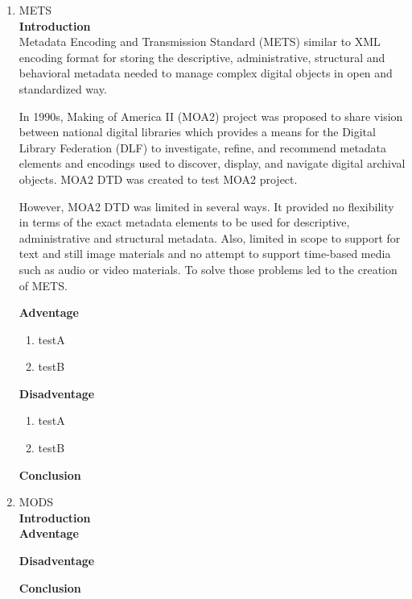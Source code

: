 \documentclass[a4paper]{article} %
\begin{document}
	\begin{enumerate}
		\item METS\\
		{\bf Introduction}\\
		Metadata Encoding and Transmission Standard (METS) similar to XML encoding format for storing the descriptive, administrative, structural and behavioral metadata needed to manage complex digital objects in open and standardized way.
		
		In 1990s, Making of America II (MOA2) project was proposed to share vision between national digital libraries which provides a means for the Digital Library Federation (DLF) to investigate, refine, and recommend metadata elements and encodings used to discover, display, and navigate digital archival objects. MOA2 DTD was created to test MOA2 project.
		
		However, MOA2 DTD was limited in several ways. It provided no flexibility in terms of the exact metadata elements to be used for descriptive, administrative and structural metadata. Also, limited in scope to support for text and still image materials and no attempt to support time-based media such as audio or video materials. To solve those problems led to the creation of METS.
		
		{\bf Adventage}
		\begin{enumerate}
			\item testA
			\item testB
		\end{enumerate}	
		{\bf Disadventage}
		\begin{enumerate}
			\item testA
			\item testB
		\end{enumerate}
		{\bf Conclusion}\\	
		
		\item MODS\\
		{\bf Introduction}\\
		
		{\bf Adventage}
		\begin{enumerate}
			
		\end{enumerate}	
		{\bf Disadventage}
		\begin{enumerate}
			
		\end{enumerate}
		{\bf Conclusion}\\
		

\end{enumerate}
\end{document}
